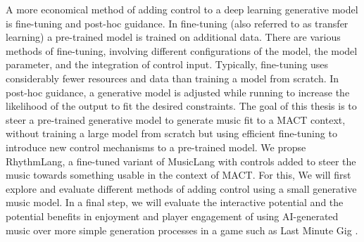 A more economical method of adding control to a deep learning generative model is fine-tuning and post-hoc guidance. In fine-tuning (also referred to as transfer learning) a pre-trained model is trained on additional data. There are various methods of fine-tuning, involving different configurations of the model, the model parameter, and the integration of control input. Typically, fine-tuning uses considerably fewer resources and data than training a model from scratch. In post-hoc guidance, a generative model is adjusted while running to increase the likelihood of the output to fit the desired constraints. The goal of this thesis is to steer a pre-trained generative model to generate music fit to a MACT context, without training a large model from scratch but using efficient fine-tuning to introduce new control mechanisms to a pre-trained model. We propse RhythmLang, a fine-tuned variant of MusicLang with controls added to steer the music towards something usable in the context of MACT. For this, We will first explore and evaluate different methods of adding control using a small generative music model. In a final step, we will evaluate the interactive potential and the potential benefits in enjoyment and player engagement of using AI-generated music over more simple generation processes in a game such as Last Minute Gig \cite{Chalkiadakis_2022}.

